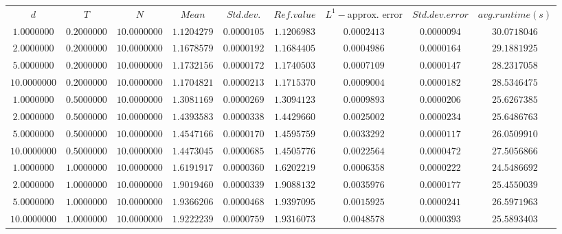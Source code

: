 \begin{tabular}{ccccccccc}
$d$ & $T$ & $N$ & $Mean$ & $Std. dev.$ & $Ref. value$ & $L^1-$approx. error & $Std. dev. error$ & $avg. runtime (s)$\\
$1.0000000$ & $0.2000000$ & $10.0000000$ & $1.1204279$ & $0.0000105$ & $1.1206983$ & $0.0002413$ & $0.0000094$ & $30.0718046$\\
$2.0000000$ & $0.2000000$ & $10.0000000$ & $1.1678579$ & $0.0000192$ & $1.1684405$ & $0.0004986$ & $0.0000164$ & $29.1881925$\\
$5.0000000$ & $0.2000000$ & $10.0000000$ & $1.1732156$ & $0.0000172$ & $1.1740503$ & $0.0007109$ & $0.0000147$ & $28.2317058$\\
$10.0000000$ & $0.2000000$ & $10.0000000$ & $1.1704821$ & $0.0000213$ & $1.1715370$ & $0.0009004$ & $0.0000182$ & $28.5346475$\\
$1.0000000$ & $0.5000000$ & $10.0000000$ & $1.3081169$ & $0.0000269$ & $1.3094123$ & $0.0009893$ & $0.0000206$ & $25.6267385$\\
$2.0000000$ & $0.5000000$ & $10.0000000$ & $1.4393583$ & $0.0000338$ & $1.4429660$ & $0.0025002$ & $0.0000234$ & $25.6486763$\\
$5.0000000$ & $0.5000000$ & $10.0000000$ & $1.4547166$ & $0.0000170$ & $1.4595759$ & $0.0033292$ & $0.0000117$ & $26.0509910$\\
$10.0000000$ & $0.5000000$ & $10.0000000$ & $1.4473045$ & $0.0000685$ & $1.4505776$ & $0.0022564$ & $0.0000472$ & $27.5056866$\\
$1.0000000$ & $1.0000000$ & $10.0000000$ & $1.6191917$ & $0.0000360$ & $1.6202219$ & $0.0006358$ & $0.0000222$ & $24.5486692$\\
$2.0000000$ & $1.0000000$ & $10.0000000$ & $1.9019460$ & $0.0000339$ & $1.9088132$ & $0.0035976$ & $0.0000177$ & $25.4550039$\\
$5.0000000$ & $1.0000000$ & $10.0000000$ & $1.9366206$ & $0.0000468$ & $1.9397095$ & $0.0015925$ & $0.0000241$ & $26.5971963$\\
$10.0000000$ & $1.0000000$ & $10.0000000$ & $1.9222239$ & $0.0000759$ & $1.9316073$ & $0.0048578$ & $0.0000393$ & $25.5893403$\\
\end{tabular}
